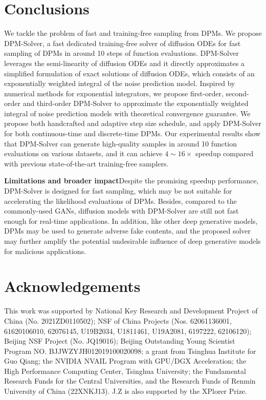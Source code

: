 \documentclass{article}
\numberwithin{equation}{section}
\theoremstyle{plain}
\theoremstyle{definition}
\begin{document}
\section{Conclusions}
\label{sec:conclusion}
We tackle the problem of fast and training-free sampling from DPMs. 
We propose DPM-Solver, a fast dedicated training-free solver of diffusion ODEs for fast sampling of DPMs in around 10 steps of function evaluations. DPM-Solver leverages the semi-linearity of diffusion ODEs and it directly approximates a simplified formulation of exact solutions of diffusion ODEs, which consists of an exponentially weighted integral of the noise prediction model. Inspired by numerical methods for exponential integrators, we propose first-order, second-order and third-order DPM-Solver to approximate the exponentially weighted integral of noise prediction models with theoretical convergence guarantee. We propose both handcrafted and adaptive step size schedule, and apply DPM-Solver for both continuous-time and discrete-time DPMs. Our experimental results show that DPM-Solver can generate high-quality samples in around 10 function evaluations on various datasets, and it can achieve $4\sim 16\times$ speedup  compared with previous state-of-the-art training-free samplers.


\textbf{Limitations and broader impact}\quad Despite the promising speedup performance, DPM-Solver is designed for fast sampling, which may be not suitable for accelerating the likelihood evaluations of DPMs. Besides, compared to the commonly-used GANs, diffusion models with DPM-Solver are still not fast enough for real-time applications. In addition, like other deep generative models, DPMs may be used to generate adverse fake contents, and the proposed solver may further amplify the potential undesirable influence of deep generative models for malicious applications.

\section*{Acknowledgements}


This work was supported by National Key Research and Development Project of China (No. 2021ZD0110502); NSF of China Projects (Nos. 62061136001, 61620106010, 62076145, U19B2034, U1811461, U19A2081, 6197222, 62106120); Beijing NSF Project (No. JQ19016); Beijing Outstanding Young Scientist Program NO. BJJWZYJH012019100020098; a grant from Tsinghua Institute for Guo Qiang; the NVIDIA NVAIL Program with GPU/DGX Acceleration; the High Performance Computing Center, Tsinghua University; the Fundamental Research Funds for the Central Universities, and the Research Funds of Renmin University of China (22XNKJ13). J.Z is also supported by the XPlorer Prize.






\newpage
\appendix

\end{document}
